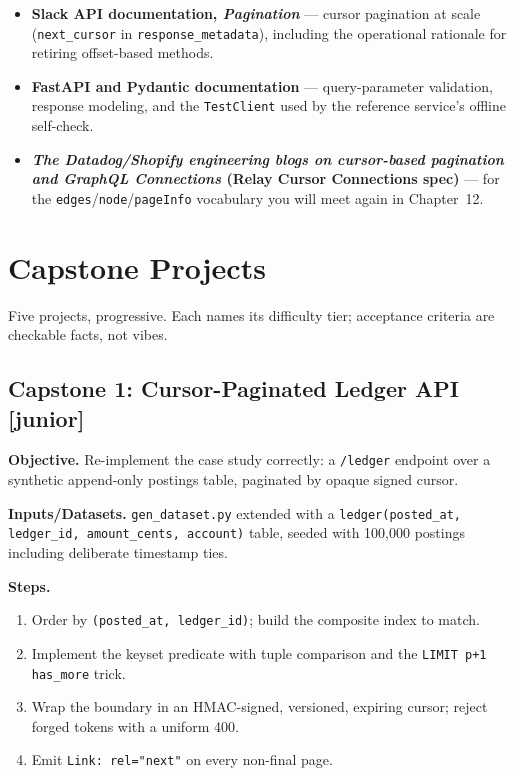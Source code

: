 \begin{itemize}
        (\texttt{starting\_after}/\texttt{ending\_before},
        \texttt{has\_more}); read it as a case study in minimal,
        stable contracts.
  \item \textbf{Slack API documentation, \emph{Pagination}} --- cursor
        pagination at scale (\texttt{next\_cursor} in
        \texttt{response\_metadata}), including the operational rationale
        for retiring offset-based methods.
  \item \textbf{FastAPI and Pydantic documentation}
        \cite{fastapidocs,pydanticdocs} --- query-parameter validation,
        response modeling, and the \texttt{TestClient} used by the
        reference service's offline self-check.
  \item \textbf{\emph{The Datadog/Shopify engineering blogs on cursor-based
        pagination and GraphQL Connections} (Relay Cursor Connections
        spec)} --- for the \texttt{edges}/\texttt{node}/\texttt{pageInfo}
        vocabulary you will meet again in Chapter~12.
\end{itemize}

\section{Capstone Projects}
\label{sec:ch8-capstones}

Five projects, progressive. Each names its difficulty tier; acceptance
criteria are checkable facts, not vibes.

\subsection{Capstone 1: Cursor-Paginated Ledger API [junior]}

\textbf{Objective.} Re-implement the case study correctly: a
\texttt{/ledger} endpoint over a synthetic append-only postings table,
paginated by opaque signed cursor.

\textbf{Inputs/Datasets.} \texttt{gen\_dataset.py} extended with a
\texttt{ledger(posted\_at, ledger\_id, amount\_cents, account)} table,
seeded with 100{,}000 postings including deliberate timestamp ties.

\textbf{Steps.}
\begin{enumerate}
  \item Order by \texttt{(posted\_at, ledger\_id)}; build the composite
        index to match.
  \item Implement the keyset predicate with tuple comparison and the
        \texttt{LIMIT p+1} \texttt{has\_more} trick.
  \item Wrap the boundary in an HMAC-signed, versioned, expiring cursor;
        reject forged tokens with a uniform 400.
  \item Emit \texttt{Link: rel="next"} on every non-final page.
\end{enumerate}

